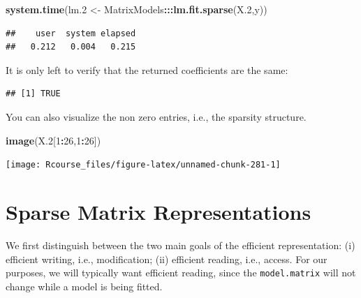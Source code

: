 \documentclass[]{book}
\newenvironment{Shaded}{\begin{snugshade}}{\end{snugshade}}
\newcommand{\KeywordTok}[1]{\textcolor[rgb]{0.13,0.29,0.53}{\textbf{#1}}}
\newcommand{\DataTypeTok}[1]{\textcolor[rgb]{0.13,0.29,0.53}{#1}}
\newcommand{\DecValTok}[1]{\textcolor[rgb]{0.00,0.00,0.81}{#1}}
\newcommand{\FloatTok}[1]{\textcolor[rgb]{0.00,0.00,0.81}{#1}}
\newcommand{\StringTok}[1]{\textcolor[rgb]{0.31,0.60,0.02}{#1}}
\newcommand{\OperatorTok}[1]{\textcolor[rgb]{0.81,0.36,0.00}{\textbf{#1}}}
\newcommand{\NormalTok}[1]{#1}
\theoremstyle{definition}
\theoremstyle{definition}
\theoremstyle{definition}
\theoremstyle{remark}
\begin{document}
\begin{Shaded}
\begin{Highlighting}[]
\KeywordTok{system.time}\NormalTok{(lm.}\DecValTok{2}\NormalTok{ <-}\StringTok{ }\NormalTok{MatrixModels}\OperatorTok{:::}\KeywordTok{lm.fit.sparse}\NormalTok{(X.}\DecValTok{2}\NormalTok{,y))}
\end{Highlighting}
\end{Shaded}

\begin{verbatim}
##    user  system elapsed 
##   0.212   0.004   0.215
\end{verbatim}

It is only left to verify that the returned coefficients are the same:

\begin{Shaded}
\end{Shaded}

\begin{verbatim}
## [1] TRUE
\end{verbatim}

You can also visualize the non zero entries, i.e., the sparsity
structure.

\begin{Shaded}
\begin{Highlighting}[]
\KeywordTok{image}\NormalTok{(X.}\DecValTok{2}\NormalTok{[}\DecValTok{1}\OperatorTok{:}\DecValTok{26}\NormalTok{,}\DecValTok{1}\OperatorTok{:}\DecValTok{26}\NormalTok{])}
\end{Highlighting}
\end{Shaded}

\texttt{[image: Rcourse\_files/figure-latex/unnamed-chunk-281-1]}

\section{Sparse Matrix
Representations}\label{sparse-matrix-representations}

We first distinguish between the two main goals of the efficient
representation: (i) efficient writing, i.e., modification; (ii)
efficient reading, i.e., access. For our purposes, we will typically
want efficient reading, since the \texttt{model.matrix} will not change
while a model is being fitted.
\end{document}
